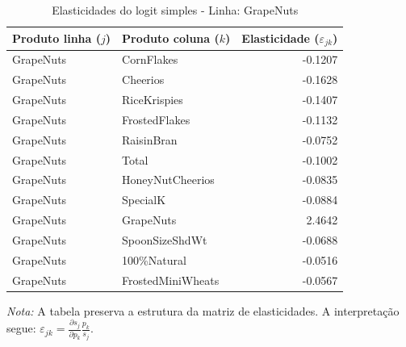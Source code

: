 \begingroup
\begin{table}[H]
\centering
\caption{Elasticidades do logit simples - Linha: GrapeNuts}
\label{tab:elas-grapenuts}
\small
\begin{tabular}{llr}
\toprule
Produto linha ($j$) & Produto coluna ($k$) & Elasticidade ($\varepsilon_{jk}$) \\
\midrule
GrapeNuts & CornFlakes & -0.1207 \\
GrapeNuts & Cheerios & -0.1628 \\
GrapeNuts & RiceKrispies & -0.1407 \\
GrapeNuts & FrostedFlakes & -0.1132 \\
GrapeNuts & RaisinBran & -0.0752 \\
GrapeNuts & Total & -0.1002 \\
GrapeNuts & HoneyNutCheerios & -0.0835 \\
GrapeNuts & SpecialK & -0.0884 \\
GrapeNuts & GrapeNuts & 2.4642 \\
GrapeNuts & SpoonSizeShdWt & -0.0688 \\
GrapeNuts & 100\%Natural & -0.0516 \\
GrapeNuts & FrostedMiniWheats & -0.0567 \\
\bottomrule
\end{tabular}

\vspace{0.3em}
\footnotesize
\textit{Nota:} A tabela preserva a estrutura da matriz de elasticidades. A interpretação segue: $\varepsilon_{jk}=\frac{\partial s_j}{\partial p_k}\frac{p_k}{s_j}$.
\end{table}
\endgroup


